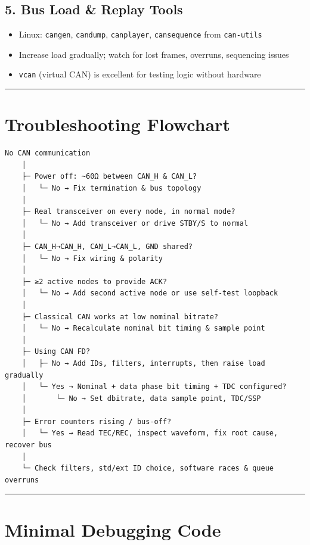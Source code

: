 \documentclass[12pt,a4paper,oneside]{report}
\providecommand{\tightlist}{\setlength{\itemsep}{0pt}\setlength{\parskip}{0pt}}
\begin{document}
\subsection{5. Bus Load \& Replay Tools}\label{bus-load-replay-tools}

\begin{itemize}
\tightlist
\item
  Linux: \texttt{cangen}, \texttt{candump}, \texttt{canplayer},
  \texttt{cansequence} from \texttt{can-utils}
\item
  Increase load gradually; watch for lost frames, overruns, sequencing issues
\item
  \texttt{vcan} (virtual CAN) is excellent for testing logic without hardware
\end{itemize}

\begin{center}\rule{0.5\linewidth}{0.5pt}\end{center}

\section{Troubleshooting Flowchart}\label{troubleshooting-flowchart}

\begin{verbatim}
No CAN communication
    │
    ├─ Power off: ~60Ω between CAN_H & CAN_L?
    │   └─ No → Fix termination & bus topology
    │
    ├─ Real transceiver on every node, in normal mode?
    │   └─ No → Add transceiver or drive STBY/S to normal
    │
    ├─ CAN_H→CAN_H, CAN_L→CAN_L, GND shared?
    │   └─ No → Fix wiring & polarity
    │
    ├─ ≥2 active nodes to provide ACK?
    │   └─ No → Add second active node or use self-test loopback
    │
    ├─ Classical CAN works at low nominal bitrate?
    │   └─ No → Recalculate nominal bit timing & sample point
    │
    ├─ Using CAN FD?
    │   ├─ No → Add IDs, filters, interrupts, then raise load gradually
    │   └─ Yes → Nominal + data phase bit timing + TDC configured?
    │       └─ No → Set dbitrate, data sample point, TDC/SSP
    │
    ├─ Error counters rising / bus-off?
    │   └─ Yes → Read TEC/REC, inspect waveform, fix root cause, recover bus
    │
    └─ Check filters, std/ext ID choice, software races & queue overruns
\end{verbatim}

\begin{center}\rule{0.5\linewidth}{0.5pt}\end{center}

\section{Minimal Debugging Code}\label{minimal-debugging-code}
\end{document}

